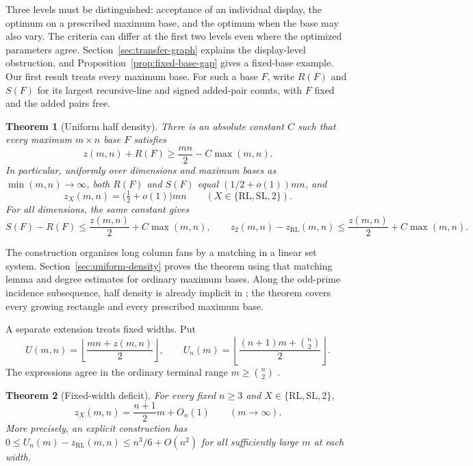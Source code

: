 \documentclass[11pt,a4paper]{article}
\newtheorem{theorem}{Theorem}[section]
\theoremstyle{definition}
\newcommand{\zr}{z_{\mathrm{RL}}}
\newcommand{\zt}{z_2}
\newcommand{\fl}[1]{\left\lfloor #1\right\rfloor}
\begin{document}
Three levels must be distinguished: acceptance of an individual display,
the optimum on a prescribed maximum base, and the optimum when the base
may also vary. The criteria can differ at the first two levels even where
the optimized parameters agree. Section~\ref{sec:transfer-graph} explains
the display-level obstruction, and Proposition~\ref{prop:fixed-base-gap}
gives a fixed-base example. Our first result treats every maximum base.
For such a base $F$, write $R(F)$ and $S(F)$ for its largest recursive-line
and signed added-pair counts, with $F$ fixed and the added pairs free.
\begin{theorem}[Uniform half density]\label{thm:uniform-density}
There is an absolute constant $C$ such that every maximum $m\times n$
base $F$ satisfies
\[
 z(m,n)+R(F)\ge\frac{mn}{2}-C\max(m,n).
\]
In particular, uniformly over dimensions and maximum bases as
$\min(m,n)\to\infty$, both $R(F)$ and $S(F)$ equal
$(1/2+o(1))mn$, and
\[
 z_X(m,n)=\bigl(\tfrac12+o(1)\bigr)mn
 \qquad(X\in\{\mathrm{RL},\mathrm{SL},2\}).
\]
For all dimensions, the same constant gives
\[
 S(F)-R(F)\le\frac{z(m,n)}2+C\max(m,n),\qquad
 \zt(m,n)-\zr(m,n)\le\frac{z(m,n)}2+C\max(m,n).
\]
\end{theorem}


The construction organizes long column fans by a matching in a linear set
system. Section~\ref{sec:uniform-density} proves the theorem using that
matching lemma and degree estimates for ordinary maximum bases. Along the
odd-prime incidence subsequence, half density is already implicit in
\cite[Corollary~6.4]{LQ}; the theorem covers every growing rectangle and
every prescribed maximum base.

A separate extension treats fixed widths.
Put
\begin{equation}\label{eq:cap}
 U(m,n)=\fl{\frac{mn+z(m,n)}2},\qquad
 U_n(m)=\fl{\frac{(n+1)m+\binom n2}{2}}.
\end{equation}
The expressions agree in the ordinary terminal range
$m\ge\binom n2$ \cite{Culik}.

\begin{theorem}[Fixed-width deficit]\label{thm:asymptotic}
For every fixed $n\ge3$ and $X\in\{\mathrm{RL},\mathrm{SL},2\}$,
\begin{equation}\label{eq:fixedslope}
 z_X(m,n)=\frac{n+1}{2}m+O_n(1)\qquad(m\longrightarrow\infty).
\end{equation}
More precisely, an explicit construction has
$0\le U_n(m)-\zr(m,n)\le n^3/6+O(n^2)$ for all sufficiently large
$m$ at each width.
\end{theorem}
\end{document}
